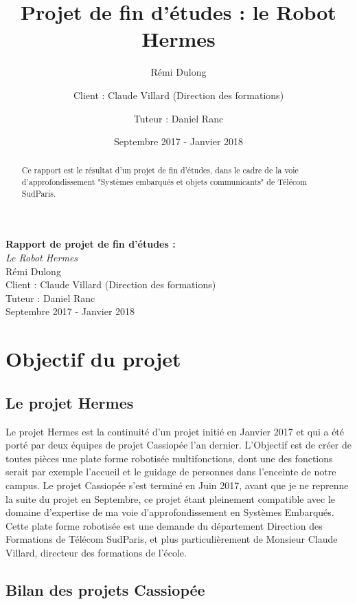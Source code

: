 \documentclass{report}
\title{Projet de fin d'études : le Robot Hermes}
\author{Rémi Dulong \and{Client : Claude Villard (Direction des formations)}
\and{Tuteur : Daniel Ranc}}
\date{Septembre 2017 - Janvier 2018}
\begin{document}
\begin{titlepage}
  \centering
  \vfill
  {\bfseries \Huge
      Rapport de projet de fin d'études : \\
  }
  {\huge
      \textit{Le Robot Hermes}\\
      Rémi Dulong\\
      Client : Claude Villard (Direction des formations)\\
      Tuteur : Daniel Ranc\\
      \vskip2cm
      Septembre 2017 - Janvier 2018\\
  }
  \vfill

  \vfill
  \vfill
\end{titlepage}

  \newpage

  \begin{abstract}
      {Ce rapport est le résultat d'un projet de fin d'études, dans le cadre de
       la voie d'approfondissement "Systèmes embarqués et objets communicants"
       de Télécom SudParis.}
  \end{abstract}

  \tableofcontents
  \newpage

\chapter{Objectif du projet}

  \section{Le projet Hermes}

    {Le projet Hermes est la continuité d'un projet initié en Janvier 2017 et
    qui a été porté par deux équipes de projet Cassiopée l'an dernier. L'Objectif
    est de créer de toutes pièces une plate forme robotisée multifonctions, dont
    une des fonctions serait par exemple l'accueil et le guidage de personnes dans
    l'enceinte de notre campus. Le projet Cassiopée s'est terminé en Juin 2017,
    avant que je ne reprenne la suite du projet en Septembre, ce projet étant pleinement
    compatible avec le domaine d'expertise de ma voie d'approfondissement en
    Systèmes Embarqués. Cette plate forme robotisée est une demande du département
    Direction des Formations de Télécom SudParis, et plus particulièrement de
    Monsieur Claude Villard, directeur des formations de l'école.}

    \section{Bilan des projets Cassiopée}
\end{document}
